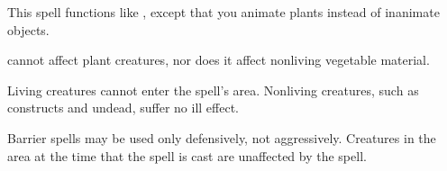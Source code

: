 \begin{comment}
\spellsection{Animate Objects}
\spelldesc{You imbue inanimate objects with mobility and a semblance of life.}
\spellschool{Transmutation (Animation)}
\spelllvl{Chaos 5, Trans 5}
\spellrng{\rngmed}
\spellarea{\areamed radius limit}
\spelltgts{One Small object/level within the area; see text}
\spelldur{\durshort}
\spellsr{No}
\begin{spelleffect}
  Each animated object immediately attacks whomever or whatever you initially designate. Your control of the objects is limited to simple commands (``Attack,'' ``Defend,'' ``Stop,'' and so forth).
  \par An animated object can be of any nonmagical material. You may animate one Small or smaller object or an equivalent number of larger objects per caster level. A Medium object counts as two Small or smaller objects, a Large object as four, a Huge object as eight, a Gargantuan object as sixteen, and a Colossal object as thirty-two. You can give the objects new commands as a move action, as normal for directing an active spell.
\end{spelleffect}
\begin{spellnotes}
  This spell cannot animate objects carried or worn by a creature. This spell can be made permanent with a \spell{permanency} ritual.
\end{spellnotes}
\end{comment}

\begin{spelleffect}
  This spell functions like , except that you animate plants instead of inanimate objects.
\end{spelleffect}
\begin{spellnotes}
   cannot affect plant creatures, nor does it affect nonliving vegetable material.
\end{spellnotes}

\begin{spelleffect}
    Living creatures cannot enter the spell's area. Nonliving creatures, such as constructs and undead, suffer no ill effect.
\end{spelleffect}
\begin{spellnotes}
  Barrier spells may be used only defensively, not aggressively. Creatures in the area at the time that the spell is cast are unaffected by the spell.
\end{spellnotes}

